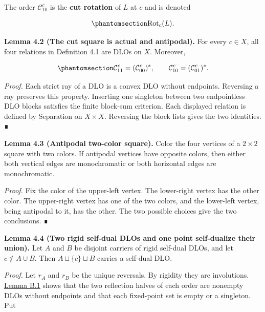 \documentclass[
  english,
  11pt,
  reqno]{amsart}
\newcounter{none} %
\begin{document}
The order \(\mathcal C_{10}^c\) is the \textbf{cut rotation} of \(L\) at
\(c\) and is denoted

\begin{equation}\protect\phantomsection\label{eq:cut-rotation}{
\operatorname{Rot}_c(L).
}\end{equation}

\protect{}\label{lem:4-2-cut-square-actual}

\textbf{Lemma 4.2 (The cut square is actual and antipodal).} For every
\(c\in X\), all four relations in Definition 4.1 are DLOs on \(X\).
Moreover,

\begin{equation}\protect\phantomsection\label{eq:cut-square-antipodal}{
\mathcal C_{11}^c
=
(\mathcal C_{00}^c)^*,
\qquad
\mathcal C_{10}^c
=
(\mathcal C_{01}^c)^*.
}\end{equation}

\emph{Proof.} Each strict ray of a DLO is a convex DLO without
endpoints. Reversing a ray preserves this property. Inserting one
singleton between two endpointless DLO blocks satisfies the finite
block-sum criterion. Each displayed relation is defined by Separation on
\(X\times X\). Reversing the block lists gives the two identities. ∎

\protect{}\label{lem:4-3-antipodal-coloring}

\textbf{Lemma 4.3 (Antipodal two-color square).} Color the four vertices
of a \(2\times2\) square with two colors. If antipodal vertices have
opposite colors, then either both vertical edges are monochromatic or
both horizontal edges are monochromatic.

\emph{Proof.} Fix the color of the upper-left vertex. The lower-right
vertex has the other color. The upper-right vertex has one of the two
colors, and the lower-left vertex, being antipodal to it, has the other.
The two possible choices give the two conclusions. ∎

\protect{}\label{lem:4-4-selfdual-amalgamation}

\textbf{Lemma 4.4 (Two rigid self-dual DLOs and one point self-dualize
their union).} Let \(A\) and \(B\) be disjoint carriers of rigid
self-dual DLOs, and let \(c\notin A\cup B\). Then
\(A\sqcup\{c\}\sqcup B\) carries a self-dual DLO.

\emph{Proof.} Let \(r_A\) and \(r_B\) be the unique reversals. By
rigidity they are involutions. \hyperref[lem:b-1-reflection-split]{Lemma
B.1} shows that the two reflection halves of each order are nonempty
DLOs without endpoints and that each fixed-point set is empty or a
singleton. Put
\end{document}
